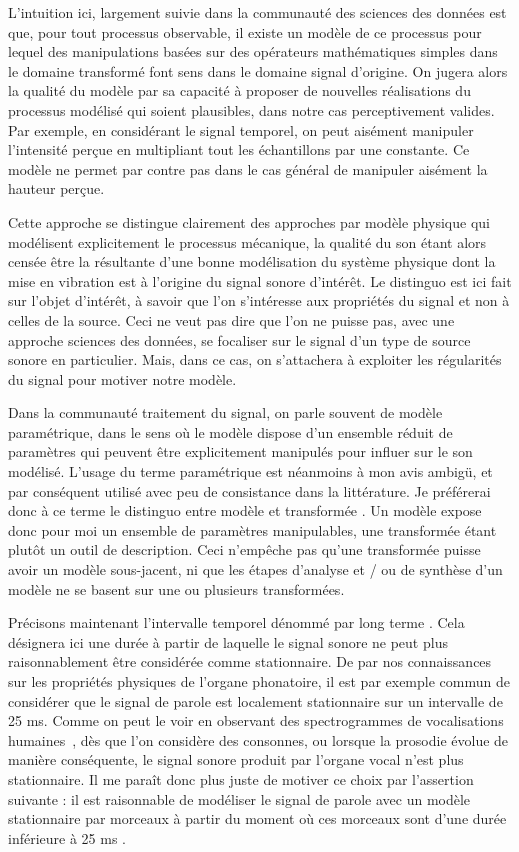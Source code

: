 L'intuition ici, largement suivie dans la communauté des sciences des données est que, pour tout processus observable, il existe un modèle de ce processus pour lequel des manipulations basées sur des opérateurs mathématiques simples dans le domaine transformé \og font sens \fg dans le domaine \og signal \fg d'origine. On jugera alors la qualité du modèle par sa capacité à proposer de nouvelles réalisations du processus modélisé qui soient plausibles, dans notre cas perceptivement valides. Par exemple, en considérant le signal temporel, on peut aisément manipuler l'intensité perçue en multipliant tout les échantillons par une constante. Ce modèle ne permet par contre pas dans le cas général de manipuler aisément la hauteur perçue.

Cette approche se distingue clairement des approches par \og modèle physique \fg qui modélisent explicitement le processus mécanique, la qualité du son étant alors censée être la résultante d'une bonne modélisation du système physique dont la mise en vibration est à l'origine du signal sonore d'intérêt. Le distinguo est ici fait sur l'objet d'intérêt, à savoir que l'on s'intéresse aux propriétés du signal et non à celles de la source. Ceci ne veut pas dire que l'on ne puisse pas, avec une approche sciences des données, se focaliser sur le signal d'un type de source sonore en particulier. Mais, dans ce cas, on s'attachera à exploiter les régularités du signal pour motiver notre modèle.

Dans la communauté traitement du signal, on parle souvent de modèle paramétrique, dans le sens où le modèle dispose d'un ensemble réduit de paramètres qui peuvent être explicitement manipulés pour influer sur le son modélisé. L'usage du terme \og paramétrique \fg est néanmoins à mon avis ambigü, et par conséquent utilisé avec peu de consistance dans la littérature. Je préférerai donc à ce terme le distinguo entre \og modèle \fg et \og transformée \fg. Un modèle expose donc pour moi un ensemble de paramètres manipulables, une transformée étant plutôt un outil de description. Ceci n'empêche pas qu'une transformée puisse avoir un modèle sous-jacent, ni que les étapes d'analyse et / ou de synthèse d'un modèle ne se basent sur une ou plusieurs transformées.

Précisons maintenant l'intervalle temporel dénommé par \og long terme \fg. Cela désignera ici une durée à partir de laquelle le signal sonore ne peut plus raisonnablement être considérée comme stationnaire. De par nos connaissances sur les propriétés physiques de l'organe phonatoire, il est par exemple commun de considérer que le signal de parole est localement stationnaire sur un intervalle de 25 ms. Comme on peut le voir en observant des spectrogrammes de vocalisations humaines~\cite{ladefoged2014course}, dès que l'on considère des consonnes, ou lorsque la prosodie évolue de manière conséquente, le signal sonore produit par l'organe vocal n'est plus stationnaire. Il me paraît donc plus juste de motiver ce choix par l'assertion suivante : \og il est raisonnable de modéliser le signal de parole avec un modèle stationnaire par morceaux à partir du moment où ces morceaux sont d'une durée inférieure à 25 ms \fg.

